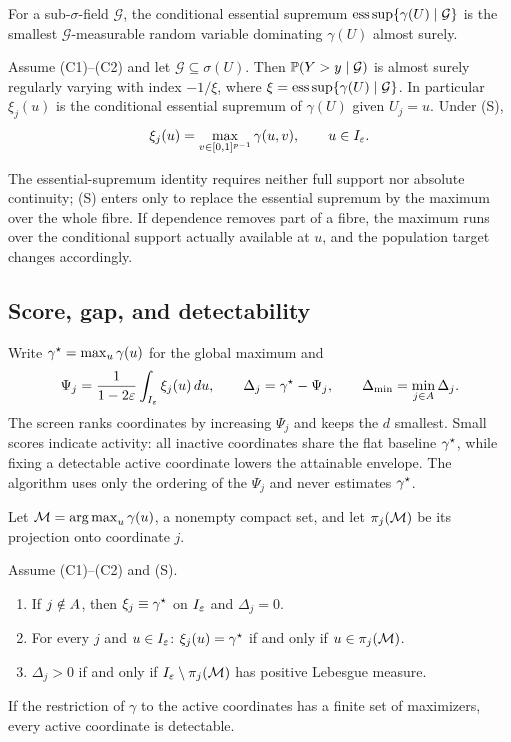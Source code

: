 For a sub-$\sigma$-field $\mathcal G$, the conditional essential
supremum $\operatorname*{ess\,sup}\{\gamma(U)\mid\mathcal G\}$ is the smallest
$\mathcal G$-measurable random variable dominating $\gamma(U)$ almost
surely.

\begin{proposition}[Projection]\label{prop:projection}
Assume (C1)--(C2) and let $\mathcal G\subseteq\sigma(U)$. Then
$\mathbb P(Y>y\mid\mathcal G)$ is almost surely regularly varying with index
$-1/\xi$, where $\xi=\operatorname*{ess\,sup}\{\gamma(U)\mid\mathcal G\}$. In particular
$\xi_j(u)$ is the conditional essential supremum of $\gamma(U)$ given
$U_j=u$. Under (S),
\begin{equation}\label{eq:fibre}
 \xi_j(u)=\max_{v\in[0,1]^{p-1}}\gamma(u,v),\qquad u\in I_\varepsilon.
\end{equation}
\end{proposition}

The essential-supremum identity requires neither full support nor absolute
continuity; (S) enters only to replace the essential supremum by the
maximum over the whole fibre. If dependence removes part of a fibre, the
maximum runs over the conditional support actually available at $u$, and
the population target changes accordingly.

\subsection{Score, gap, and detectability}

Write $\gamma^\star=\max_u\gamma(u)$ for the global maximum and
\begin{equation}\label{eq:score}
 \Psi_j=\frac{1}{1-2\varepsilon}\int_{I_\varepsilon}\xi_j(u)\,du,
 \qquad
 \Delta_j=\gamma^\star-\Psi_j,
 \qquad
 \Delta_{\min}=\min_{j\in A}\Delta_j.
\end{equation}
The screen ranks coordinates by increasing $\Psi_j$ and keeps the $d$
smallest. Small scores indicate activity: all inactive coordinates share the
flat baseline $\gamma^\star$, while fixing a detectable active coordinate lowers
the attainable envelope. The algorithm uses only the ordering of the
$\Psi_j$ and never estimates $\gamma^\star$.

Let $\mathcal{M}=\operatorname*{arg\,max}_u\gamma(u)$, a nonempty compact set, and let $\pi_j(\mathcal{M})$ be
its projection onto coordinate $j$.

\begin{proposition}[Detectability]\label{prop:geometry}
Assume (C1)--(C2) and (S).
\begin{enumerate}
\item If $j\notin A$, then $\xi_j\equiv\gamma^\star$ on $I_\varepsilon$ and $\Delta_j=0$.
\item For every $j$ and $u\in I_\varepsilon$: $\xi_j(u)=\gamma^\star$ if and only if
$u\in\pi_j(\mathcal{M})$.
\item $\Delta_j>0$ if and only if $I_\varepsilon\setminus\pi_j(\mathcal{M})$ has positive
Lebesgue measure.
\end{enumerate}
If the restriction of $\gamma$ to the active coordinates has a finite set
of maximizers, every active coordinate is detectable.
\end{proposition}

